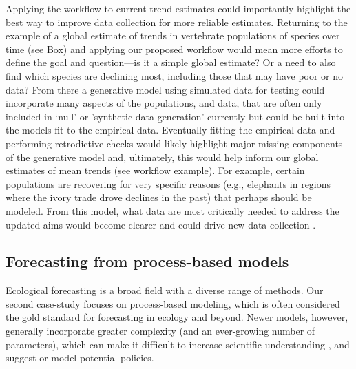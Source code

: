 \documentclass[11pt]{article}
\begin{document}
Applying the workflow to current trend estimates could importantly highlight the best way to improve data collection for more reliable estimates. Returning to the example of a global estimate of trends in vertebrate populations of species over time (see Box) and applying our proposed workflow would mean more efforts to define the goal and question---is it a simple global estimate?
Or a need to also find which species are declining most, including those that may have poor or no data? From there a generative model using simulated data for testing could incorporate many aspects of the populations, and data, that are often only included in `null' or 'synthetic data generation' currently \citep{Buschke2021,mcrae2025utility} but could be built into the models fit to the empirical data. Eventually fitting the empirical data and performing retrodictive checks would likely highlight major missing components of the generative model and, ultimately, this would help inform our global estimates of mean trends (see workflow example). For example, certain populations are recovering for very specific reasons (e.g., elephants in regions where the ivory trade drove declines in the past) that perhaps should be modeled. From this model, what data are most critically needed to address the updated aims would become clearer and could drive new data collection \citep{toszogyova2024mathematical}. 

\subsection{Forecasting from process-based models}

Ecological forecasting is a broad field with a diverse range of methods. Our second case-study focuses on process-based modeling, which is often considered the gold standard for forecasting in ecology \citep{Urban2016, Pilowsky2022} and beyond. Newer models, however, generally incorporate greater complexity (and an ever-growing number of parameters), which can make it difficult to increase scientific understanding \citep{Franklin2020}, and suggest or model potential policies. 
\end{document}

